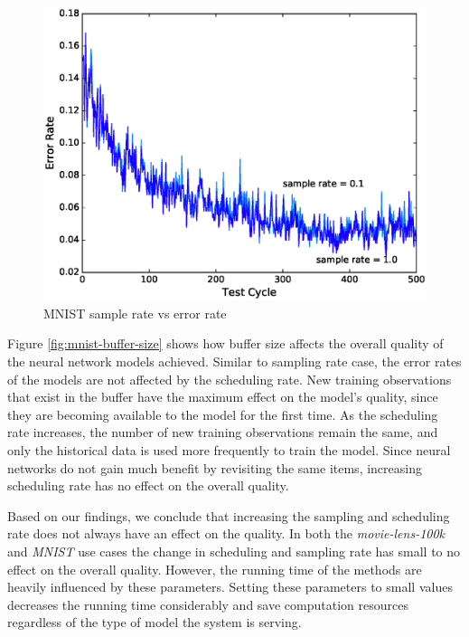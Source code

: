 \documentclass{vldb}
\begin{document}
\begin{figure}[!ht]
\centering
\includegraphics[width=\columnwidth]{../images/experiment-results/mnist-sampling.eps}
\caption{MNIST sample rate vs error rate}
\label{fig:mnist-sample-rate}
\end{figure}

Figure \ref{fig:mnist-buffer-size} shows how buffer size affects the overall quality of the neural network models achieved.
Similar to sampling rate case, the error rates of the models are not affected by the scheduling rate.
New training observations that exist in the buffer have the maximum effect on the model's quality, since they are becoming available to the model for the first time.
As the scheduling rate increases, the number of new training observations remain the same, and only the historical data is used more frequently to train the model.
Since neural networks do not gain much benefit by revisiting the same items, increasing scheduling rate has no effect on the overall quality.

Based on our findings, we conclude that increasing the sampling and scheduling rate does not always have an effect on the quality.
In both the \textit{movie-lens-100k} and \textit{MNIST} use cases the change in scheduling and sampling rate has small to no effect on the overall quality.
However, the running time of the methods are heavily influenced by these parameters.
Setting these parameters to small values decreases the running time considerably and save computation resources regardless of the type of model the system is serving.
\end{document}
